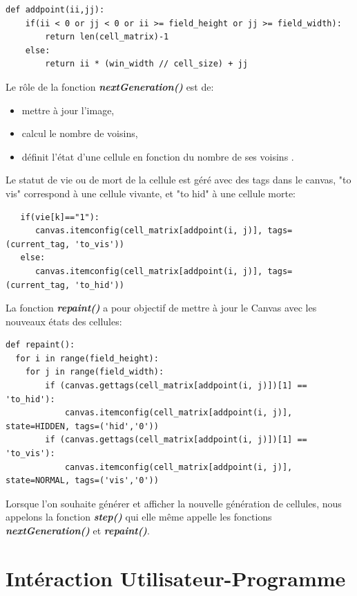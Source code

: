 \documentclass{article}
\begin{document}
\begin{verbatim}
def addpoint(ii,jj):
    if(ii < 0 or jj < 0 or ii >= field_height or jj >= field_width):
        return len(cell_matrix)-1  
    else:
        return ii * (win_width // cell_size) + jj
\end{verbatim}

\vspace{3mm}

\noindent Le rôle de la fonction \textbf{\textit{nextGeneration()}} est de:
\begin{itemize}
\item mettre à jour l'image,
\item calcul le nombre de voisins,
\item définit l'état d'une cellule en fonction du nombre de ses voisins .
\end{itemize}
Le statut de vie ou de mort de la cellule est géré avec des tags dans le canvas, "to vis" correspond à une cellule vivante, et "to hid" à une cellule morte:
\begin{verbatim}
   if(vie[k]=="1"): 
      canvas.itemconfig(cell_matrix[addpoint(i, j)], tags=(current_tag, 'to_vis'))
   else:
      canvas.itemconfig(cell_matrix[addpoint(i, j)], tags=(current_tag, 'to_hid'))
\end{verbatim}

\vspace{3mm}

\noindent La fonction \textbf{\textit{repaint()}} a pour objectif de mettre à jour le Canvas avec les nouveaux états des cellules:
\begin{verbatim}
def repaint():
  for i in range(field_height):
	for j in range(field_width):			
		if (canvas.gettags(cell_matrix[addpoint(i, j)])[1] == 'to_hid'):
			canvas.itemconfig(cell_matrix[addpoint(i, j)], state=HIDDEN, tags=('hid','0'))
		if (canvas.gettags(cell_matrix[addpoint(i, j)])[1] == 'to_vis'):
			canvas.itemconfig(cell_matrix[addpoint(i, j)], state=NORMAL, tags=('vis','0'))
\end{verbatim}

\vspace{3mm}

\noindent Lorsque l'on souhaite générer et afficher la nouvelle génération de cellules, nous appelons la fonction \textbf{\textit{step()}} qui elle même appelle les fonctions \textbf{\textit{nextGeneration()}} et \textbf{\textit{repaint()}}.

\newpage

\section{Intéraction Utilisateur-Programme}
\end{document}
